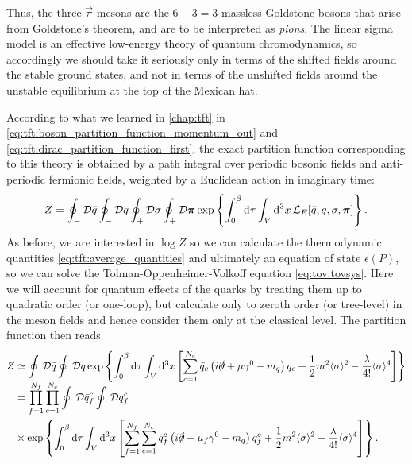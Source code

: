Thus, the three $\vec\pi$-mesons are the $6 - 3 = 3$ massless Goldstone bosons that arise from Goldstone's theorem, and are to be interpreted as \emph{pions}.
The linear sigma model is an effective low-energy theory of quantum chromodynamics, so accordingly we should take it seriously only in terms of the shifted fields around the stable ground states, and not in terms of the unshifted fields around the unstable equilibrium at the top of the Mexican hat.

According to what we learned in \cref{chap:tft} in \cref{eq:tft:boson_partition_function_momentum_out} and \eqref{eq:tft:dirac_partition_function_first},
the exact partition function corresponding to this theory is obtained by a path integral over periodic bosonic fields and anti-periodic fermionic fields, weighted by a Euclidean action in imaginary time:
\begin{equation}
	Z = \oint_- \mathcal{D} \bar{q} \oint_- \mathcal{D} q \oint_+ \mathcal{D} \sigma \oint_+ \mathcal{D} {\bm{\pi}} \exp \left\{ \int_0^\beta \mathop{}\!\mathrm{d} \tau \int_V \mathop{}\!\mathrm{d}^3 x \, \mathcal{L}_E[\bar{q}, q, \sigma, {\bm{\pi}}]  \right\} .
\end{equation}
As before, we are interested in $\log Z$ so we can calculate the thermodynamic quantities \eqref{eq:tft:average_quantities} and ultimately an equation of state $\epsilon(P)$, so we can solve the Tolman-Oppenheimer-Volkoff equation \eqref{eq:tov:tovsys}.
Here we will account for quantum effects of the quarks by treating them up to quadratic order (or one-loop),
but calculate only to zeroth order (or tree-level) in the meson fields and hence consider them only at the classical level.
The partition function then reads
\begin{equation}
\begin{split}
	Z &\simeq \oint_- \mathcal{D} \bar{q} \oint_- \mathcal{D} q \exp \left\{ \int_0^{\beta} \mathop{}\!\mathrm{d} \tau \int_V \mathop{}\!\mathrm{d}^3 x \left[ \sum_{c=1}^{N_c} \bar{q}_c \left( i \slashed\partial + \mu \gamma^0 - m_q \right) q_c + \frac12 m^2 \langle \sigma \rangle^2 - \frac{\lambda}{4!} \langle \sigma \rangle^4 \right] \right\} \\
	  &=       \prod_{f=1}^{\smash{N_f}} \prod_{c=1}^{\smash{N_c}} \oint_- \mathcal{D} \bar{q}_f^c \oint_- \mathcal{D} q_f^c \\
	  &\times  \exp \left\{ \int_0^{\beta} \mathop{}\!\mathrm{d} \tau \int_V \mathop{}\!\mathrm{d}^3 x \left[ \sum_{f=1}^{\smash{N_f}} \sum_{c=1}^{N_c} \bar{q}_f^c \left( i \slashed\partial + \mu_f \gamma^0 - m_q \right) q_f^c + \frac12 m^2 \langle \sigma \rangle^2 - \frac{\lambda}{4!} \langle \sigma \rangle^4 \right] \right\}.
\end{split}
\end{equation}
